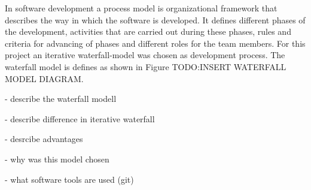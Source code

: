 In software development a process model is organizational framework that describes the way in which the software is developed. It defines different phases of the development, activities that are carried out during these phases, rules and criteria for advancing of phases and different roles for the team members. For this project an iterative waterfall-model was chosen as development process. 
The waterfall model is defines as shown in Figure TODO:INSERT WATERFALL MODEL DIAGRAM.  

- describe the waterfall modell

- describe difference in iterative waterfall

- desrcibe advantages

- why was this model chosen

- what software tools are used (git)

